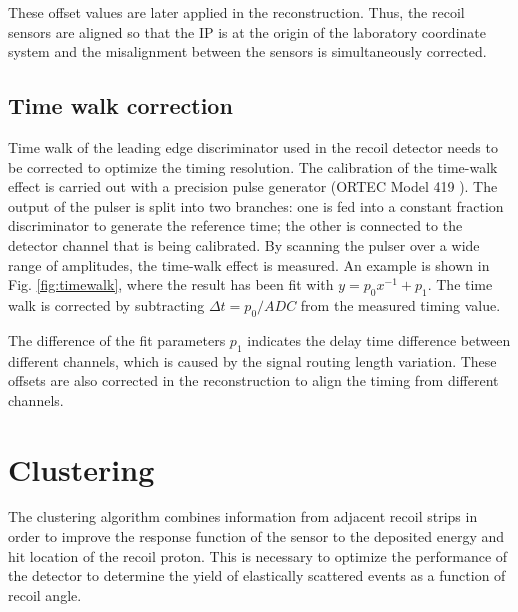 \documentclass[number,5p]{elsarticle}
\begin{document}
These offset values are later applied in the reconstruction.
Thus, the recoil sensors are aligned so that the IP is at the origin of the
laboratory coordinate system and the misalignment between the sensors is
simultaneously corrected.

\subsection{Time walk correction}
\label{sec:timewalk}

Time walk of the leading edge discriminator used in the recoil detector needs to be corrected to optimize the timing resolution.
The calibration of the time-walk effect is carried out with a precision pulse generator (ORTEC Model 419 \cite{ortec}). 
The output of the pulser is split into two branches: one is fed into a constant fraction discriminator to generate the reference time;
the other is connected to the detector channel that is being calibrated. 
By scanning the pulser over a wide range of amplitudes, the time-walk effect is measured.
An example is shown in Fig. \ref{fig:timewalk}, where the result has been fit with \(y=p_0 x^{-1} + p_1\). 
The time walk is corrected by subtracting \(\Delta t = p_0/ADC\) from the measured timing value.

The difference of the fit parameters \(p_1\) indicates the delay time
difference between different channels, which is caused by the signal routing length variation.
These offsets are also corrected in the reconstruction to align the timing from different channels.

\section{Clustering}
\label{sec:clustering}


The clustering algorithm combines information from adjacent recoil strips in
order to improve the response function of the sensor to the deposited energy and
hit location of the recoil proton.
This is necessary to optimize the performance of the detector to determine the yield of elastically scattered events as a function of recoil angle.
\end{document}
